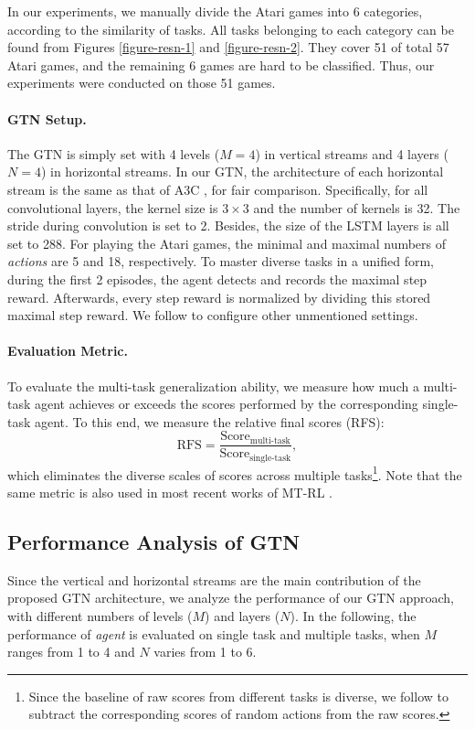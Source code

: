 \documentclass[letterpaper]{article} %
\begin{document}
In our experiments, we manually divide the Atari games into 6 categories, according to the similarity of tasks. All tasks belonging to each category can be found from Figures \ref{figure-resn-1} and \ref{figure-resn-2}. They cover 51 of total 57 Atari games, and the remaining 6 games are hard to be classified. Thus, our experiments were conducted on those 51 games.

\paragraph{GTN Setup.}
The GTN is simply set with 4 levels ($M=4$) in vertical streams and 4 layers ($N=4$) in horizontal streams.
In our GTN, the architecture of each horizontal stream is the same as that of A3C \cite{mnih2016asynchronous}, for fair comparison.
Specifically, for all convolutional layers, the kernel size is $3 \times 3$ and the number of kernels is 32.
The stride during convolution is set to 2.
Besides, the size of the LSTM layers is all set to 288.
For playing the Atari games, the minimal and maximal numbers of \textit{actions} are 5 and 18, respectively.
To master diverse tasks in a unified form, during the first 2 episodes, the agent detects and records the maximal step reward.
Afterwards, every step reward is normalized by dividing this stored maximal step reward.
We follow \cite{mnih2016asynchronous} to configure other unmentioned settings.

\paragraph{Evaluation Metric.} To evaluate the multi-task generalization ability, we measure how much a multi-task agent achieves or exceeds the scores performed by the corresponding single-task agent. To this end, we measure the relative final scores (RFS):
\begin{equation}
\label{eva}
\textrm{RFS}=\frac{\text{Score}_{\text{multi-task}}}{\text{Score}_{\text{single-task}}},
\end{equation}
which eliminates the diverse scales of scores across multiple tasks\footnote{Since the baseline of raw scores from different tasks is diverse, we follow \cite{mnih2015human} to subtract the corresponding scores of random actions from the raw scores.}. Note that the same metric is also used in most recent works of MT-RL \cite{rusu2015policy,parisotto16_actormimic}.

\subsection{Performance Analysis of GTN}
\label{section-ablative-study}
Since the vertical and horizontal streams are the main contribution of the proposed GTN architecture, we analyze the performance of our GTN approach, with different numbers of levels ($M$) and layers ($N$).
In the following, the performance of \textit{agent} is evaluated on single task and multiple tasks, when $M$ ranges from 1 to 4 and $N$ varies from 1 to 6.
\end{document}

